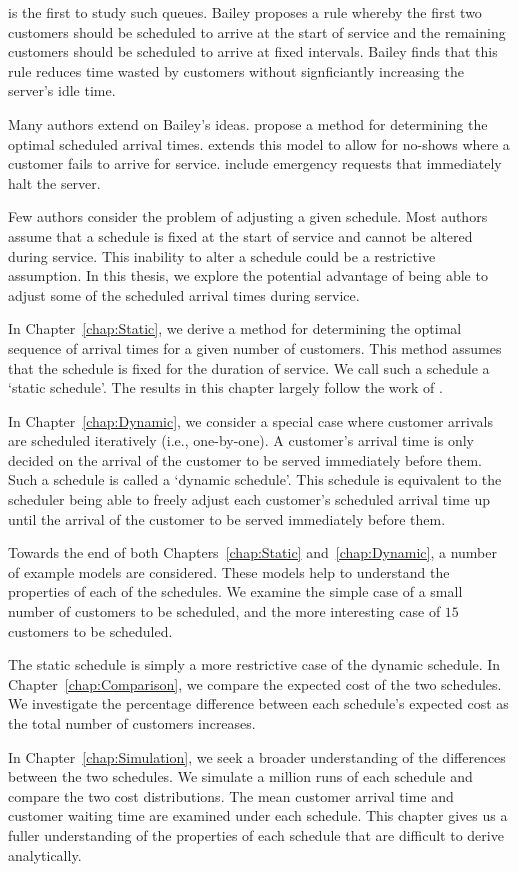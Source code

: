 \citet{Bailey} is the first to study such queues. Bailey proposes a rule whereby the first two customers should be scheduled to arrive at the start of service and the remaining customers should be scheduled to arrive at fixed intervals. Bailey finds that this rule reduces time wasted by customers without signficiantly increasing the server's idle time.

Many authors extend on Bailey's ideas. \citet{Pegden} propose a method for determining the optimal scheduled arrival times. \citet{Mendel} extends this model to allow for no-shows where a customer fails to arrive for service. \citet{Fiems} include emergency requests that immediately halt the server.

Few authors consider the problem of adjusting a given schedule. Most authors assume that a schedule is fixed at the start of service and cannot be altered during service. This inability to alter a schedule could be a restrictive assumption. In this thesis, we explore the potential advantage of being able to adjust some of the scheduled arrival times during service.

In Chapter~\ref{chap:Static}, we derive a method for determining the optimal sequence of arrival times for a given number of customers. This method assumes that the schedule is fixed for the duration of service. We call such a schedule a `static schedule'. The results in this chapter largely follow the work of \citet{Pegden}.

In Chapter~\ref{chap:Dynamic}, we consider a special case where customer arrivals are scheduled iteratively (i.e., one-by-one). A customer's arrival time is only decided on the arrival of the customer to be served immediately before them. Such a schedule is called a `dynamic schedule'. This schedule is equivalent to the scheduler being able to freely adjust each customer's scheduled arrival time up until the arrival of the customer to be served immediately before them.

Towards the end of both Chapters~\ref{chap:Static} and~\ref{chap:Dynamic}, a number of example models are considered. These models help to understand the properties of each of the schedules. We examine the simple case of a small number of customers to be scheduled, and the more interesting case of $15$ customers to be scheduled.

The static schedule is simply a more restrictive case of the dynamic schedule. In Chapter~\ref{chap:Comparison}, we compare the expected cost of the two schedules. We investigate the percentage difference between each schedule's expected cost as the total number of customers increases.

In Chapter~\ref{chap:Simulation}, we seek a broader understanding of the differences between the two schedules. We simulate a million runs of each schedule and compare the two cost distributions. The mean customer arrival time and customer waiting time are examined under each schedule. This chapter gives us a fuller understanding of the properties of each schedule that are difficult to derive analytically.